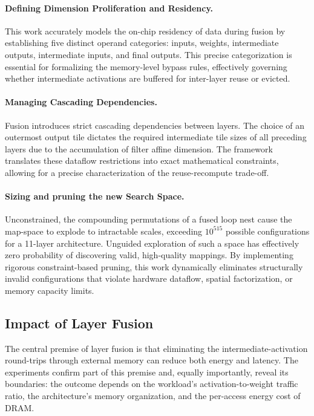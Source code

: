 \paragraph{Defining Dimension Proliferation and Residency.}
This work accurately models the on-chip residency of data during fusion by establishing five distinct operand categories: inputs, weights, intermediate outputs, intermediate inputs, and final outputs. This precise categorization is essential for formalizing the memory-level bypass rules, effectively governing whether intermediate activations are buffered for inter-layer reuse or evicted. 

\paragraph{Managing Cascading Dependencies.}
Fusion introduces strict cascading dependencies between layers. The choice of an outermost output tile dictates the required intermediate tile sizes of all preceding layers due to the accumulation of filter affine dimension. The framework translates these dataflow restrictions into exact mathematical constraints, allowing for a precise characterization of the reuse-recompute trade-off.

\paragraph{Sizing and pruning the new Search Space.}
Unconstrained, the compounding permutations of a fused loop nest cause the map-space to explode to intractable scales, exceeding $10^{515}$ possible configurations for a 11-layer architecture. Unguided exploration of such a space has effectively zero probability of discovering valid, high-quality mappings. By implementing rigorous constraint-based pruning, this work dynamically eliminates structurally invalid configurations that violate hardware dataflow, spatial factorization, or memory capacity limits. 


\subsection{Impact of Layer Fusion}
\label{sec:concl-fusion-impact}

The central premise of layer fusion is that eliminating the
intermediate-activation round-trips through external memory can
reduce both energy and latency.
The experiments confirm part of this premise and, equally
importantly, reveal its boundaries: the outcome depends on the
workload's activation-to-weight traffic ratio, the architecture's
memory organization, and the per-access energy cost of DRAM.

